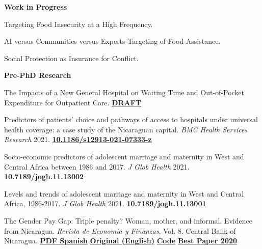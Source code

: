 \documentclass[10pt]{article}
\newcommand{\link}[2]{\href{#1}{\textcolor{cvloc}{\textbf{\underline{#2}}}}}
\newcommand{\todolink}[1]{\textcolor{cvloc}{\textbf{\underline{#1}}}}
\begin{document}
\textbf{Work in Progress}\par
\begin{sqlist}[itemsep=8pt]
  \item Targeting Food Insecurity at a High Frequency.
  \item AI versus Communities versus Experts Targeting of Food Assistance.
  \item Social Protection as Insurance for Conflict.
\end{sqlist}
\textbf{Pre-PhD Research}\par
\begin{sqlist}[itemsep=8pt]
  \item The Impacts of a New General Hospital on Waiting Time and Out-of-Pocket Expenditure for Outpatient Care. \todolink{DRAFT}
  \item Predictors of patients' choice and pathways of access to hospitals under universal health coverage: a case study of the Nicaraguan capital. \textit{BMC Health Services Research} 2021. \link{https://doi.org/10.1186/s12913-021-07333-z}{10.1186/s12913-021-07333-z}
  \item Socio-economic predictors of adolescent marriage and maternity in West and Central Africa between 1986 and 2017. \textit{J Glob Health} 2021. \link{https://doi.org/10.7189/jogh.11.13002}{10.7189/jogh.11.13002}
  \item Levels and trends of adolescent marriage and maternity in West and Central Africa, 1986-2017. \textit{J Glob Health} 2021. \link{https://doi.org/10.7189/jogh.11.13001}{10.7189/jogh.11.13001}
  \item The Gender Pay Gap: Triple penalty? Woman, mother, and informal. Evidence from Nicaragua. \textit{Revista de Economía y Finanzas}, Vol. 8. Central Bank of Nicaragua. \link{https://www.bcn.gob.ni/sites/default/files/revista/volumenVIII/Revista_Vol_8_202P1.pdf}{PDF Spanish} \link{https://jonathangarciaf.github.io/files/papers/triple_penalty_gender_wage_gap_en.pdf}{Original (English)} \link{https://github.com/jonathangarciaf/triple_penalty_gender_pay_gap}{Code} \link{https://bcn.gob.ni/nota-de-prensa/bcn-realiza-ceremonia-de-premiacion-del-premio-de-economia-finanzas-y-desarrollo}{Best Paper 2020}
\end{sqlist}

\newpage
\end{document}
